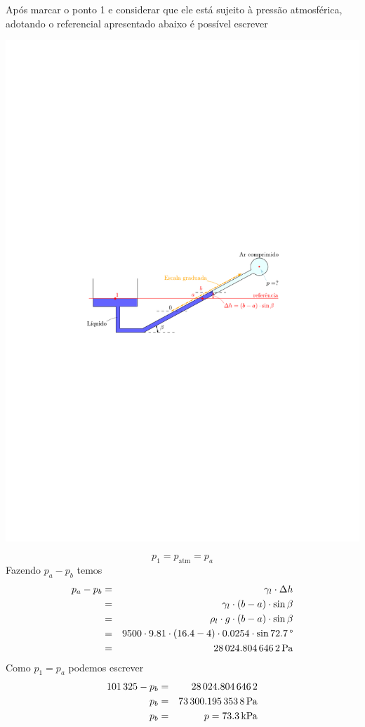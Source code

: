 \documentclass[
	a4paper,
	12pt,
	brazilian
]{article}
\begin{document}
	Após marcar o ponto 1 e considerar que ele está sujeito à pressão atmosférica, adotando o referencial apresentado abaixo é possível escrever
	\begin{center}
		\includegraphics[width=1\linewidth]{assets/images/referencia_4}
	\end{center}
	\begin{equation}
		p_{1}=p_{\textrm{atm}}=p_{a}
	\end{equation}
	Fazendo $p_{a}-p_{b}$ temos
	\begin{eqnarray}
		p_{a}-p_{b}&=&\gamma_{l}\cdot\Delta h\\
		&=&\gamma_{l}\cdot (b-a)\cdot\sin\beta\\
		&=&\rho_{l}\cdot g\cdot (b-a)\cdot\sin\beta\\
		&=&9500\cdot 9.81\cdot (16.4-4)\cdot 0.0254\cdot\sin\SI{72.7}{\SIUnitSymbolDegree}\\
		&=&\SI{28024.8046462}{\pascal}
	\end{eqnarray}
	Como $p_{1}=p_{a}$ podemos escrever
	\begin{eqnarray}
		101\,325-p_{b}&=&28\,024.804\,646\,2\\
		p_{b}&=&\SI{73\,300.1953538}{\pascal}\\
		p_{b}&=&p=\SI{73.3}{\kilo\pascal}
	\end{eqnarray}
\end{document}
